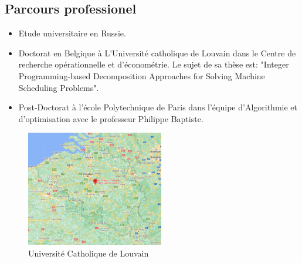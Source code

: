 \documentclass[12pt]{article}
\begin{document}
    \subsection*{Parcours professionel}\label{subsec:parcours-professionel}
    \begin{itemize}
    \item Etude universitaire en Russie.
    \item Doctorat en Belgique à L'Université catholique de Louvain dans le Centre de recherche opérationnelle et
    d'économétrie.
    Le sujet de sa thèse est: "Integer Programming-based Decomposition Approaches for Solving Machine Scheduling Problems".
    \item Post-Doctorat à l'école Polytechnique de Paris dans l'équipe d'Algorithmie et d'optimisation avec le
    professeur Philippe Baptiste.
    \end{itemize}
    \begin{figure}
        \centering
        \includegraphics[width=6cm]{image/Map-UCLouvain.png}
        \caption{Université Catholique de Louvain}
        \label{fig:UC Louvain}
    \end{figure}

    \newpage
\end{document}
